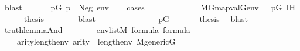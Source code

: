 \begin{isabellebody}
\ blast\isanewline
\ \ \isamarkupfalse%
\isanewline
\ \ \isamarkupfalse%
\ {\isachardoublequoteopen}{\isasymexists}p{\isasymin}G{\isachardot}{\kern0pt}\ {\isacharparenleft}{\kern0pt}p\ {\isasymtturnstile}\ Neg{\isacharparenleft}{\kern0pt}{\isasymphi}{\isacharparenright}{\kern0pt}\ env{\isacharparenright}{\kern0pt}{\isachardoublequoteclose}\isanewline
\ \ \isamarkupfalse%
\ {\isacharparenleft}{\kern0pt}cases{\isacharparenright}{\kern0pt}\isanewline
\ \ \ \ \isamarkupfalse%
\ {}\isanewline
\ \ \ \ \isamarkupfalse%
\ {\isacartoucheopen}{\isasymnot}\ {\isacharparenleft}{\kern0pt}M{\isacharbrackleft}{\kern0pt}G{\isacharbrackright}{\kern0pt}{\isacharcomma}{\kern0pt}map{\isacharparenleft}{\kern0pt}val{\isacharparenleft}{\kern0pt}G{\isacharparenright}{\kern0pt}{\isacharcomma}{\kern0pt}env{\isacharparenright}{\kern0pt}\ {\isasymTurnstile}\ {\isasymphi}{\isacharparenright}{\kern0pt}{\isacartoucheclose}\ {\isacartoucheopen}p{\isasymin}G{\isacartoucheclose}\ IH\isanewline
\ \ \ \ \isamarkupfalse%
\ {\isacharquery}{\kern0pt}thesis\isanewline
\ \ \ \ \ \ \isamarkupfalse%
\ blast\isanewline
\ \ \isamarkupfalse%
\isanewline
\ \ \ \ \isamarkupfalse%
\ {}\isanewline
\ \ \ \ \isamarkupfalse%
\ {\isacartoucheopen}p{\isasymin}G{\isacartoucheclose}\ \isanewline
\ \ \ \ \isamarkupfalse%
\ {\isacharquery}{\kern0pt}thesis\ \isamarkupfalse%
\ blast\isanewline
\ \ \isamarkupfalse%
\isanewline
{}\isamarkupfalse%
%
\endisatagproof
{\isafoldproof}%
%
\isadelimproof
\ \isanewline
%
\endisadelimproof
\isanewline
{}\isamarkupfalse%
\ truth{\isacharunderscore}{\kern0pt}lemma{\isacharunderscore}{\kern0pt}And{\isacharcolon}{\kern0pt}\isanewline
\ \ \ \isanewline
\ \ \ \ {\isachardoublequoteopen}env{\isasymin}list{\isacharparenleft}{\kern0pt}M{\isacharparenright}{\kern0pt}{\isachardoublequoteclose}\ {\isachardoublequoteopen}{\isasymphi}{\isasymin}formula{\isachardoublequoteclose}\ {\isachardoublequoteopen}{\isasympsi}{\isasymin}formula{\isachardoublequoteclose}\isanewline
\ \ \ \ {\isachardoublequoteopen}arity{\isacharparenleft}{\kern0pt}{\isasymphi}{\isacharparenright}{\kern0pt}{\isasymle}length{\isacharparenleft}{\kern0pt}env{\isacharparenright}{\kern0pt}{\isachardoublequoteclose}\ {\isachardoublequoteopen}arity{\isacharparenleft}{\kern0pt}{\isasympsi}{\isacharparenright}{\kern0pt}\ {\isasymle}\ length{\isacharparenleft}{\kern0pt}env{\isacharparenright}{\kern0pt}{\isachardoublequoteclose}\ {\isachardoublequoteopen}M{\isacharunderscore}{\kern0pt}generic{\isacharparenleft}{\kern0pt}G{\isacharparenright}{\kern0pt}{\isachardoublequoteclose}\isanewline

\end{isabellebody}
